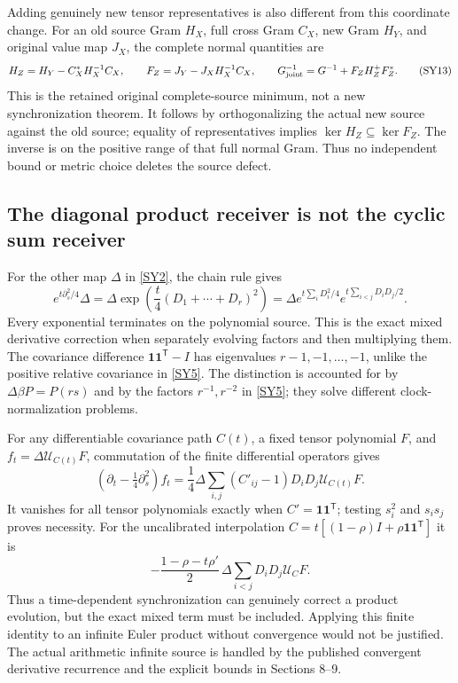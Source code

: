 \documentclass[11pt,a4paper]{article}
\theoremstyle{definition}\newtheorem{definition}[theorem]{Definition}
\newcommand{\ve}{\mathbf 1}\newcommand{\sh}{\sharp}
\begin{document}
Adding genuinely new tensor representatives is also different from this coordinate change. For an old source Gram $H_X$, full cross Gram $C_X$, new Gram $H_Y$, and original value map $J_X$, the complete normal quantities are
\begin{equation}
 H_Z=H_Y-C_X^*H_X^{-1}C_X,\qquad
 F_Z=J_Y-J_XH_X^{-1}C_X,
 \qquad G_{\rm joint}^{-1}=G^{-1}+F_ZH_Z^+F_Z^*.
                                                               \tag{SY13}\label{SY13}
\end{equation}
This is the retained original complete-source minimum, not a new synchronization theorem. It follows by orthogonalizing the actual new source against the old source; equality of representatives implies $\ker H_Z\subseteq\ker F_Z$. The inverse is on the positive range of that full normal Gram. Thus no independent bound or metric choice deletes the source defect.

\subsection{The diagonal product receiver is not the cyclic sum receiver}
For the other map $\Delta$ in \eqref{SY2}, the chain rule gives
\begin{equation}
 e^{t\partial_s^2/4}\Delta
 =\Delta\exp\left(\frac t4(D_1+\cdots+D_r)^2\right)
 =\Delta e^{t\sum_iD_i^2/4}
             e^{t\sum_{i<j}D_iD_j/2}.                        \tag{SY14}\label{SY14}
\end{equation}
Every exponential terminates on the polynomial source. This is the exact mixed derivative correction when separately evolving factors and then multiplying them. The covariance difference $\ve\ve^{\mathsf T}-I$ has eigenvalues $r-1,-1,\ldots,-1$, unlike the positive relative covariance in \eqref{SY5}. The distinction is accounted for by $\Delta\beta P=P(rs)$ and by the factors $r^{-1},r^{-2}$ in \eqref{SY5}; they solve different clock-normalization problems.

For any differentiable covariance path $C(t)$, a fixed tensor polynomial $F$, and $f_t=\Delta\mathcal U_{C(t)}F$, commutation of the finite differential operators gives
\begin{equation}
 (\partial_t-\tfrac14\partial_s^2)f_t
 =\frac14\Delta\sum_{i,j}(C'_{ij}-1)D_iD_j\mathcal U_{C(t)}F.
                                                               \tag{SY15}\label{SY15}
\end{equation}
It vanishes for all tensor polynomials exactly when $C'=\ve\ve^{\mathsf T}$; testing $s_i^2$ and $s_is_j$ proves necessity. For the uncalibrated interpolation $C=t[(1-\rho)I+\rho\ve\ve^{\mathsf T}]$ it is
\begin{equation}
 -\frac{1-\rho-t\rho'}2\,
   \Delta\sum_{i<j}D_iD_j\mathcal U_CF.                       \tag{SY16}\label{SY16}
\end{equation}
Thus a time-dependent synchronization can genuinely correct a product evolution, but the exact mixed term must be included. Applying this finite identity to an infinite Euler product without convergence would not be justified. The actual arithmetic infinite source is handled by the published convergent derivative recurrence and the explicit bounds in Sections 8--9.
\end{document}
